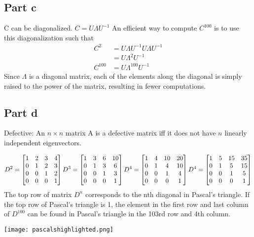 \documentclass[12pt]{article}
\begin{document}
\subsection*{Part c}
C can be diagonalized. $C=U \Lambda U^{-1}$
An efficient way to compute $C^100$ is to use this diagonalization such that
\begin{equation}
\begin{split}
C^2 &= U \Lambda U^{-1} U \Lambda U^{-1} \\
&= U \Lambda^2 U^{-1} \\
C^{100} &= U \Lambda^{100} U^{-1}
\end{split}
\end{equation}
Since $\Lambda$ is a diagonal matrix, each of the elements along the diagonal is simply raised to the power of the matrix, resulting in fewer computations.

\subsection*{Part d}
Defective: An $n \times n$ matrix A is a defective matrix iff it does not have $n$ linearly independent eigenvectors.

\begin{equation}
D^2 = 
\begin{bmatrix}
1 & 2 & 3 & 4 \\
0 & 1 & 2 & 3 \\
0 & 0 & 1 & 2 \\
0 & 0 & 0 & 1
\end{bmatrix}
\\
D^3 = 
\begin{bmatrix}
1 & 3 & 6 & 10 \\
0 & 1 & 3 & 6 \\
0 & 0 & 1 & 3 \\
0 & 0 & 0 & 1
\end{bmatrix}
\\
D^4 = 
\begin{bmatrix}
1 & 4 & 10 & 20 \\
0 & 1 & 4 & 10 \\
0 & 0 & 1 & 4 \\
0 & 0 & 0 & 1
\end{bmatrix}
\\
D^4 = 
\begin{bmatrix}
1 & 5 & 15 & 35 \\
0 & 1 & 5 & 15 \\
0 & 0 & 1 & 5 \\
0 & 0 & 0 & 1
\end{bmatrix}
\end{equation}
The top row of matrix $D^n$ corresponds to the nth diagonal in Pascal's triangle. If the top row of Pascal's triangle is 1, the element in the first row and last column of $D^{100}$ can be found in Pascal's triangle in the 103rd row and 4th column.
\begin{center}
\texttt{[image: pascalshighlighted.png]}
\end{center}
\end{document}
